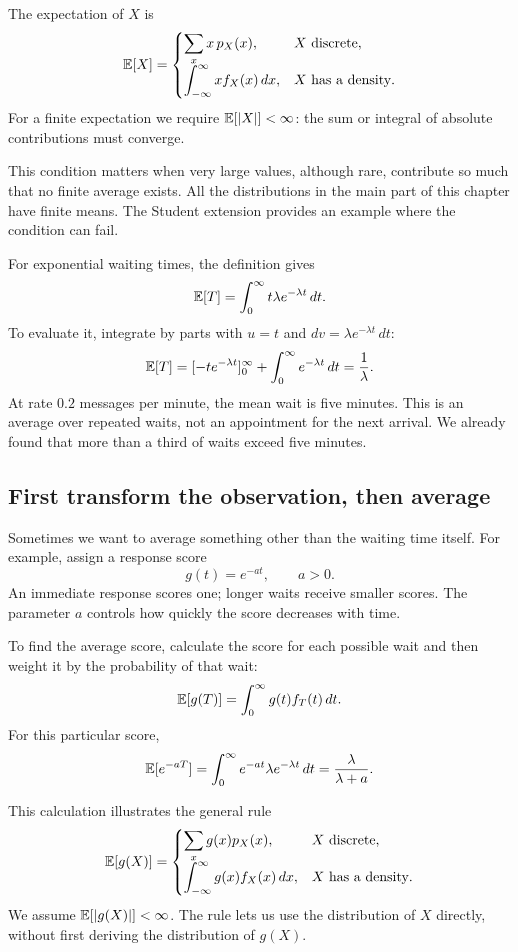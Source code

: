 \begin{definition}[Expectation]
The expectation of \(X\) is
\[
  \mathbb{E}[X]=
  \begin{cases}
    \displaystyle\sum_x x\,p_X(x),&X\text{ discrete},\\[6pt]
    \displaystyle\int_{-\infty}^{\infty}x f_X(x)\,dx,
      &X\text{ has a density}.
  \end{cases}
\]
For a finite expectation we require \(\mathbb{E}[|X|]<\infty\): the sum or
integral of absolute contributions must converge.
\end{definition}

This condition matters when very large values, although rare, contribute
so much that no finite average exists. All the distributions in the main
part of this chapter have finite means. The Student extension provides
an example where the condition can fail.

For exponential waiting times, the definition gives
\[
  \mathbb{E}[T]=\int_0^\infty t\lambda e^{-\lambda t}\,dt.
\]
To evaluate it, integrate by parts with \(u=t\) and
\(dv=\lambda e^{-\lambda t}\,dt\):
\[
  \mathbb{E}[T]
  =[-t e^{-\lambda t}]_0^\infty
    +\int_0^\infty e^{-\lambda t}\,dt
  =\frac1\lambda.
\]
At rate \(0.2\) messages per minute, the mean wait is five minutes.
This is an average over repeated waits, not an appointment for the next
arrival. We already found that more than a third of waits exceed five
minutes.

\subsection{First transform the observation, then average}

Sometimes we want to average something other than the waiting time
itself. For example, assign a response score
\[
  g(t)=e^{-at},\qquad a>0.
\]
An immediate response scores one; longer waits receive smaller scores.
The parameter \(a\) controls how quickly the score decreases with time.

To find the average score, calculate the score for each possible wait and
then weight it by the probability of that wait:
\[
  \mathbb{E}[g(T)]=\int_0^\infty g(t)f_T(t)\,dt.
\]
For this particular score,
\[
  \mathbb{E}[e^{-aT}]
  =\int_0^\infty e^{-at}\lambda e^{-\lambda t}\,dt
  =\frac{\lambda}{\lambda+a}.
\]
\begin{result}
This calculation illustrates the general rule
\begin{equation}
  \mathbb{E}[g(X)]=
  \begin{cases}
    \displaystyle\sum_x g(x)p_X(x),&X\text{ discrete},\\[6pt]
    \displaystyle\int_{-\infty}^{\infty}g(x)f_X(x)\,dx,
      &X\text{ has a density}.
  \end{cases}
  \label{eq:expectation-function}
\end{equation}
We assume \(\mathbb{E}[|g(X)|]<\infty\). The rule lets us use the distribution
of \(X\) directly, without first deriving the distribution of \(g(X)\).
\end{result}

